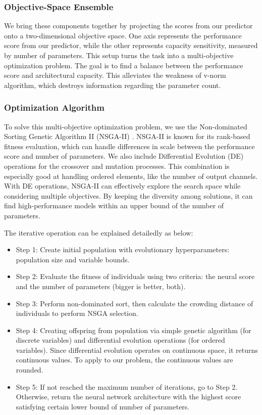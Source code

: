\documentclass[lettersize,journal]{IEEEtran}
\begin{document}
        \subsubsection{Objective-Space Ensemble}
            We bring these components together by projecting the scores from our predictor onto a two-dimensional objective space. One axis represents the performance score from our predictor, while the other represents capacity sensitivity, measured by number of parameters. This setup turns the task into a multi-objective optimization problem. The goal is to find a balance between the performance score and architectural capacity. This alleviates the weakness of v-norm algorithm, which destroys information regarding the parameter count.
        
        \subsubsection{Optimization Algorithm}
            To solve this multi-objective optimization problem, we use the Non-dominated Sorting Genetic Algorithm II (NSGA-II) \cite{NSGA}. NSGA-II is known for its rank-based fitness evaluation, which can handle differences in scale between the performance score and number of parameters. We also include Differential Evolution (DE) operations \cite{DE} for the crossover and mutation processes. This combination is especially good at handling ordered elements, like the number of output channels. With DE operations, NSGA-II can effectively explore the search space while considering multiple objectives. By keeping the diversity among solutions, it can find high-performance models within an upper bound of the number of parameters.

            The iterative operation can be explained detailedly as below:

            \begin{itemize}
                \item Step 1: Create initial population with evolutionary hyperparameters: population size and variable bounds.
                \item Step 2: Evaluate the fitness of individuals using two criteria: the neural score and the number of parameters (bigger is better, both).
                \item Step 3: Perform non-dominated sort, then calculate the crowding distance of individuals to perform NSGA selection.
                \item Step 4: Creating offspring from population via simple genetic algorithm (for discrete variables) and differential evolution operations (for ordered variables). Since differential evolution operates on continuous space, it returns continuous values. To apply to our problem, the continuous values are rounded.
                \item Step 5: If not reached the maximum number of iterations, go to Step 2. Otherwise, return the neural network architecture with the highest score satisfying certain lower bound of number of parameters.
            \end{itemize}
        
\end{document}
